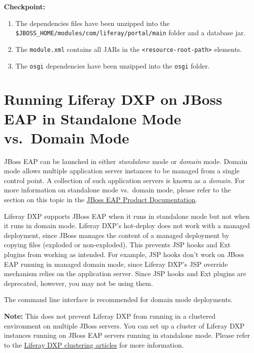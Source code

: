 \textbf{Checkpoint:}

\begin{enumerate}
\def\labelenumi{\arabic{enumi}.}
\tightlist
\item
  The dependencies files have been unzipped into the
  \texttt{\$JBOSS\_HOME/modules/com/liferay/portal/main} folder and a
  database jar.
\item
  The \texttt{module.xml} contains all JARs in the
  \texttt{\textless{}resource-root-path\textgreater{}} elements.
\item
  The \texttt{osgi} dependencies have been unzipped into the
  \texttt{osgi} folder.
\end{enumerate}

\section{Running Liferay DXP on JBoss EAP in Standalone Mode vs.~Domain
Mode}\label{running-liferay-dxp-on-jboss-eap-in-standalone-mode-vs.-domain-mode}

JBoss EAP can be launched in either \emph{standalone} mode or
\emph{domain} mode. Domain mode allows multiple application server
instances to be managed from a single control point. A collection of
such application servers is known as a \emph{domain}. For more
information on standalone mode vs.~domain mode, please refer to the
section on this topic in the
\href{https://access.redhat.com/documentation/en-us/red_hat_jboss_enterprise_application_platform/7.1/html/introduction_to_jboss_eap/overview_of_jboss_eap\#operating_modes}{JBoss
EAP Product Documentation}.

Liferay DXP supports JBoss EAP when it runs in standalone mode but not
when it runs in domain mode. Liferay DXP's hot-deploy does not work with
a managed deployment, since JBoss manages the content of a managed
deployment by copying files (exploded or non-exploded). This prevents
JSP hooks and Ext plugins from working as intended. For example, JSP
hooks don't work on JBoss EAP running in managed domain mode, since
Liferay DXP's JSP override mechanism relies on the application server.
Since JSP hooks and Ext plugins are deprecated, however, you may not be
using them.

The command line interface is recommended for domain mode deployments.

\noindent\hrulefill

\textbf{Note:} This does not prevent Liferay DXP from running in a
clustered environment on multiple JBoss servers. You can set up a
cluster of Liferay DXP instances running on JBoss EAP servers running in
standalone mode. Please refer to the
\href{/docs/7-2/deploy/-/knowledge_base/d/liferay-clustering}{Liferay
DXP clustering articles} for more information.

